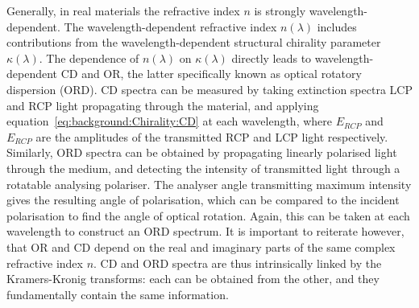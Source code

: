 Generally, in real materials the refractive index $n$ is strongly wavelength-dependent. The wavelength-dependent refractive index $n(\lambda)$ includes contributions from the wavelength-dependent structural chirality parameter $\kappa(\lambda)$. The dependence of $n(\lambda)$ on $\kappa(\lambda)$ directly leads to wavelength-dependent CD and OR, the latter specifically known as optical rotatory dispersion (ORD). CD spectra can be measured by taking extinction spectra LCP and RCP light propagating through the material, and applying equation~\ref{eq:background:Chirality:CD} at each wavelength, where $E_{RCP}$ and $E_{RCP}$ are the amplitudes of the transmitted RCP and LCP light respectively. Similarly, ORD spectra can be obtained by propagating linearly polarised light through the medium, and detecting the intensity of transmitted light through a rotatable analysing polariser. The analyser angle transmitting maximum intensity gives the resulting angle of polarisation, which can be compared to the incident polarisation to find the angle of optical rotation. Again, this can be taken at each wavelength to construct an ORD spectrum. It is important to reiterate however, that OR and CD depend on the real and imaginary parts of the same complex refractive index $n$. CD and ORD spectra are thus intrinsically linked by the Kramers-Kronig transforms: each can be obtained from the other, and they fundamentally contain the same information. 


